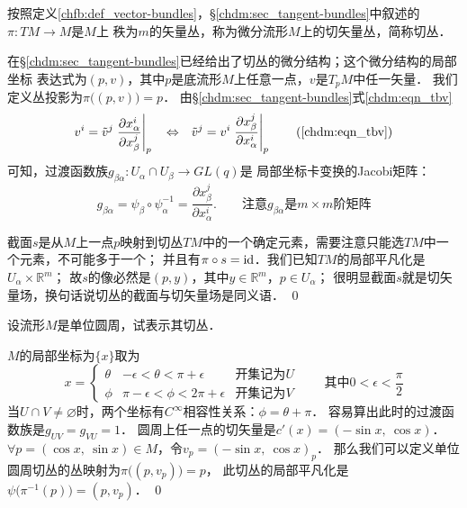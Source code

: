 \begin{example}\label{chfb:exm_tb}
    按照定义\ref{chfb:def_vector-bundles}，\S \ref{chdm:sec_tangent-bundles}中叙述的$\pi:TM\to M$是$M$上
    秩为$m$的矢量丛，称为微分流形$M$上的{\heiti 切矢量丛}，简称{\heiti 切丛}．
\end{example}
在\S \ref{chdm:sec_tangent-bundles}已经给出了切丛的微分结构；这个微分结构的局部坐标
表达式为$(p,v)$，其中$p$是底流形$M$上任意一点，$v$是$T_pM$中任一矢量．
我们定义丛投影为$\pi\bigl( (p,v)\bigr)=p$．
由\S \ref{chdm:sec_tangent-bundles}式\eqref{chdm:eqn_tbv}
\begin{equation}
    v^i = \tilde{v}^j \left. \frac{\partial {x}^i_\alpha}{\partial {x}^j_\beta}  \right | _p
    {\quad \Leftrightarrow \quad}
    \tilde{v}^j = {v}^i \left. \frac{\partial {x}^j_\beta}{\partial {x}^i_\alpha}  \right | _p 
    \tag{\ref{chdm:eqn_tbv}}
\end{equation}
可知，过渡函数族$g_{\beta\alpha}: U_\alpha \cap U_\beta \to GL(q)$是
局部坐标卡变换的Jacobi矩阵：
\begin{equation}
    g_{\beta\alpha} = \psi_\beta \circ \psi^{-1}_{\alpha}
    = \frac{\partial {x}^j_\beta}{\partial {x}^i_\alpha}  .
    \qquad \text{注意}g_{\beta\alpha}\text{是} m\times m \text{阶矩阵}
\end{equation}

截面$s$是从$M$上一点$p$映射到切丛$TM$中的一个确定元素，需要注意只能选$TM$中一个元素，不可能多于一个；
并且有$\pi \circ s = {\rm id}$．我们已知$TM$的局部平凡化是$U_\alpha \times \mathbb{R}^m$；
故$s$的像必然是$(p,y)$，其中$y\in \mathbb{R}^m$，$p\in U_\alpha$；
很明显截面$s$就是{\kaishu 切矢量场}，换句话说切丛的截面与切矢量场是同义语．
\qed

\begin{example}
    设流形$M$是单位圆周，试表示其切丛．
\end{example}
$M$的局部坐标为$\{x\}$取为
\begin{equation*}
    x=\left\{\begin{array}{ccc}
        \theta& -\epsilon <\theta<\pi+\epsilon & \text{开集记为}U \\
        \phi & \pi -\epsilon <\phi <2\pi +\epsilon  & \text{开集记为}V
    \end{array} \right.
    \qquad \text{其中} 0<\epsilon<\frac{\pi}{2}
\end{equation*}
当$U\cap V\neq \varnothing$时，两个坐标有$C^\infty$相容性关系：$\phi=\theta + \pi$．
容易算出此时的过渡函数族是$g_{UV}=g_{VU}=1$．
圆周上任一点的切矢量是$c'(x)=(-\sin x,\ \cos x)$．
$\forall p=(\cos x,\ \sin x)\in M$，令$v_p=(-\sin x,\ \cos x)_p$．
那么我们可以定义单位圆周切丛的丛映射为$\pi \bigl( (p,v_p) \bigr)=p$，
此切丛的局部平凡化是$\psi\bigl(\pi^{-1}(p) \bigr)=(p,v_p)$．
\qed


